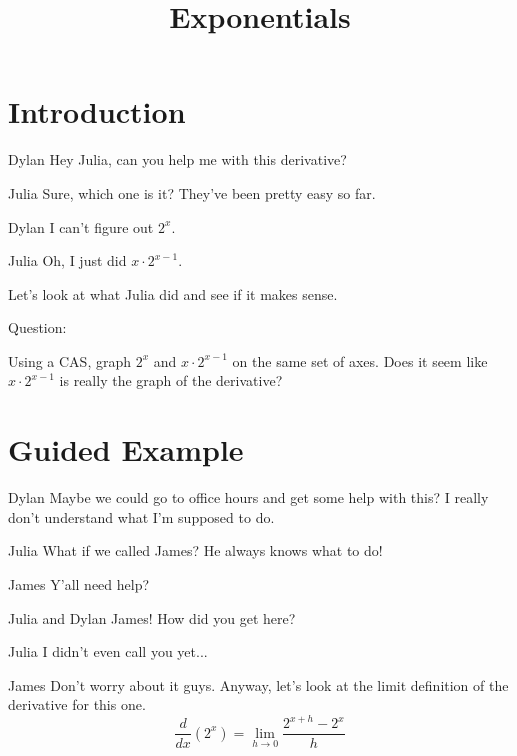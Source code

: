 \documentclass{ximera}
\title{Exponentials}
\begin{document}
\maketitle
\section{Introduction}
\begin{dialogue}
\item[Dylan] Hey Julia, can you help me with this derivative?
\item[Julia] Sure, which one is it? They've been pretty easy so far.
\item[Dylan] I can't figure out $2^x$.
\item[Julia] Oh, I just did $x \cdot 2^{x-1}$.
\end{dialogue}
Let's look at what Julia did and see if it makes sense.

Question:

Using a CAS, graph $2^x$ and $x \cdot 2^{x-1}$ on the same set of axes. Does it seem like $x \cdot 2^{x-1}$ is really the graph of the derivative?

\section{Guided Example}
\begin{dialogue}
\item[Dylan] Maybe we could go to office hours and get some help with this? I really don't understand what I'm supposed to do.
\item[Julia] What if we called James? He always knows what to do!
\item[James] Y'all need help?
\item[Julia and Dylan] James! How did you get here?
\item[Julia] I didn't even call you yet...
\item[James] Don't worry about it guys. Anyway, let's look at the limit definition of the derivative for this one. $$\dfrac{d}{dx}(2^x)=\lim_{h \to 0} \dfrac{2^{x+h}-2^x}{h}$$
\end{dialogue}
\end{document}
